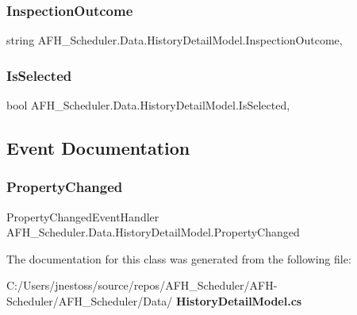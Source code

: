\mbox{\label{class_a_f_h___scheduler_1_1_data_1_1_history_detail_model_ad08251f98e173f1d691ec86974f9d5a0}} 
\subsubsection{InspectionOutcome}
{\footnotesize\ttfamily string A\+F\+H\+\_\+\+Scheduler.\+Data.\+History\+Detail\+Model.\+Inspection\+Outcome\hspace{0.3cm}{\ttfamily [get]}, {\ttfamily [set]}}

\mbox{\label{class_a_f_h___scheduler_1_1_data_1_1_history_detail_model_a1684c1243cced887212660d3912fccbd}} 
\subsubsection{IsSelected}
{\footnotesize\ttfamily bool A\+F\+H\+\_\+\+Scheduler.\+Data.\+History\+Detail\+Model.\+Is\+Selected\hspace{0.3cm}{\ttfamily [get]}, {\ttfamily [set]}}



\subsection{Event Documentation}
\mbox{\label{class_a_f_h___scheduler_1_1_data_1_1_history_detail_model_a2134f8a5b8c73c9ba313c114c1185f2a}} 
\subsubsection{PropertyChanged}
{\footnotesize\ttfamily Property\+Changed\+Event\+Handler A\+F\+H\+\_\+\+Scheduler.\+Data.\+History\+Detail\+Model.\+Property\+Changed}



The documentation for this class was generated from the following file\+:\begin{DoxyCompactItemize}
\item 
C\+:/\+Users/jnestoss/source/repos/\+A\+F\+H\+\_\+\+Scheduler/\+A\+F\+H-\/\+Scheduler/\+A\+F\+H\+\_\+\+Scheduler/\+Data/\textbf{ History\+Detail\+Model.\+cs}\end{DoxyCompactItemize}
